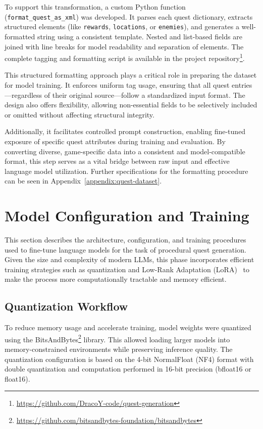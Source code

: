 To support this transformation, a custom Python function (\texttt{format\_quest\_as\_xml})
was developed. It parses each quest dictionary, extracts structured elements (like \texttt{rewards},
\texttt{locations}, or \texttt{enemies}), and generates a well-formatted string using a consistent template.
Nested and list-based fields are joined with line breaks for model readability and
separation of elements. The complete tagging and formatting script is available in the
project repository\footnote{\url{https://github.com/DracoY-code/quest-generation}}.

This structured formatting approach plays a critical role in preparing the dataset for
model training. It enforces uniform tag usage, ensuring that all quest entries—regardless
of their original source—follow a standardized input format. The design also offers flexibility,
allowing non-essential fields to be selectively included or omitted without affecting
structural integrity.

Additionally, it facilitates controlled prompt construction, enabling fine-tuned exposure
of specific quest attributes during training and evaluation. By converting diverse,
game-specific data into a consistent and model-compatible format, this step serves as a
vital bridge between raw input and effective language model utilization. Further specifications
for the formatting procedure can be seen in Appendix~\ref{appendix:quest-dataset}.

\section{Model Configuration and Training}

This section describes the architecture, configuration, and training procedures used to
fine-tune language models for the task of procedural quest generation. Given the size and
complexity of modern LLMs, this phase incorporates efficient training strategies such as
quantization and Low-Rank Adaptation (LoRA)~\cite{hu2022lora} to make the process more computationally
tractable and memory efficient.

\subsection{Quantization Workflow}

To reduce memory usage and accelerate training, model weights were quantized using
the BitsAndBytes\footnote{\url{https://github.com/bitsandbytes-foundation/bitsandbytes}} library. This allowed loading larger models into memory-constrained
environments while preserving inference quality. The quantization configuration is based
on the 4-bit NormalFloat (NF4) format with double quantization and computation performed
in 16-bit precision (bfloat16 or float16).

